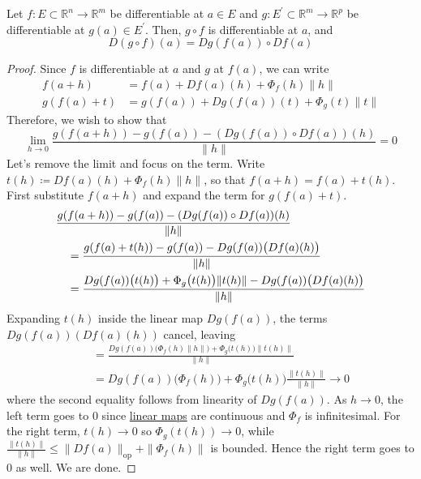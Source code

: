  \begin{theorem}
    \label{thm:chain-rule}
		Let $f: E \subset \mathbb{R}^n \to \mathbb{R}^m$ be differentiable at $a \in E$ and $g: E^\prime \subset \mathbb{R}^m \to \mathbb{R}^p$ be differentiable at $g(a) \in E^\prime$. Then, $g \circ f$ is differentiable at $a$, and 
		\begin{equation}
			D (g \circ f)(a) = D g(f(a)) \circ D f(a)
		\end{equation}
  \end{theorem}
	\begin{proof}
		Since $f$ is differentiable at $a$ and $g$ at $f(a)$, we can write 
		\begin{align}
			f(a + h) & = f(a) + Df(a) (h) + \Phi_f (h) \|h\| \\
			g(f(a) + t) & = g(f(a)) + Dg(f(a)) (t) + \Phi_g (t) \|t\|
		\end{align}
		Therefore, we wish to show that 
		\begin{equation}
			\lim_{h \to 0} \frac{g (f(a + h)) - g (f(a)) - (Dg(f(a)) \circ Df(a))(h)}{\|h\|} = 0
		\end{equation}
		Let's remove the limit and focus on the term. Write $t(h) \coloneqq Df(a)(h) + \Phi_f(h)\|h\|$, so that $f(a + h) = f(a) + t(h)$. First substitute $f(a + h)$ and expand the term for $g(f(a) + t)$. 
		\begin{align}
			& \frac{g(f(a + h)) - g(f(a)) - (Dg(f(a)) \circ Df(a))(h)}{\|h\|} \notag \\ 
			& \quad = \frac{g(f(a) + t(h)) - g(f(a)) - Dg(f(a))\big(Df(a)(h)\big)}{\|h\|} \\ 
			& \quad = \frac{Dg(f(a))\big(t(h)\big) + \Phi_g\big(t(h)\big) \|t(h)\| - Dg(f(a))\big(Df(a)(h)\big)}{\|h\|}
		\end{align}
		Expanding $t(h)$ inside the linear map $Dg(f(a))$, the terms $Dg(f(a))(Df(a)(h))$ cancel, leaving
		\begin{align}
			& \quad = \frac{Dg(f(a))\big(\Phi_f(h)\|h\|\big) + \Phi_g\big(t(h)\big) \|t(h)\|}{\|h\|} \\ 
			& \quad = Dg(f(a))\big(\Phi_f(h)\big) + \Phi_g\big(t(h)\big) \frac{\|t(h)\|}{\|h\|} \to 0
		\end{align}
		where the second equality follows from linearity of $Dg(f(a))$. As $h \to 0$, the left term goes to $0$ since \hyperref[lin-def:linear_map]{linear maps} are continuous and $\Phi_f$ is infinitesimal. For the right term, $t(h) \to 0$ so $\Phi_g(t(h)) \to 0$, while $\frac{\|t(h)\|}{\|h\|} \leq \|Df(a)\|_{\mathrm{op}} + \|\Phi_f(h)\|$ is bounded. Hence the right term goes to $0$ as well. We are done. 
	\end{proof}

